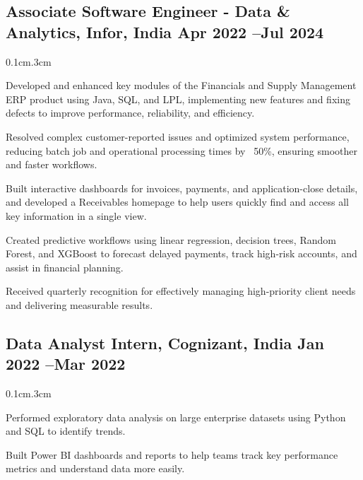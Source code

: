 \subsection{{Associate Software Engineer - Data \& Analytics, Infor, India \hfill Apr 2022 --Jul 2024}}
\begin{adjustwidth}{0.1cm}{.3cm}

\begin{zitemize}

\item Developed and enhanced key modules of the Financials and Supply Management ERP product using Java, SQL, and LPL, implementing new features and fixing defects to improve performance, reliability, and efficiency.
\item  Resolved complex customer-reported issues and optimized system performance, reducing batch job and operational processing times by ~50\%, ensuring smoother and faster workflows.
\item Built interactive dashboards for invoices, payments, and application-close details, and developed a Receivables homepage to help users quickly find and access all key information in a single view.
\item Created predictive workflows using linear regression, decision trees, Random Forest, and XGBoost to forecast delayed payments, track high-risk accounts, and assist in financial planning.
\item Received quarterly recognition for effectively managing high-priority client needs and delivering measurable results.
\end{zitemize}
\end{adjustwidth}
\vspace{.70em}


\subsection{{Data Analyst Intern, Cognizant, India \hfill Jan 2022 --Mar 2022}}
\begin{adjustwidth}{0.1cm}{.3cm}

\begin{zitemize}

\item Performed exploratory data analysis on large enterprise datasets using Python and SQL to identify trends.
\item  Built Power BI dashboards and reports to help teams track key performance metrics and understand data more easily.
\end{zitemize}
\end{adjustwidth}
\vspace{.10em}




